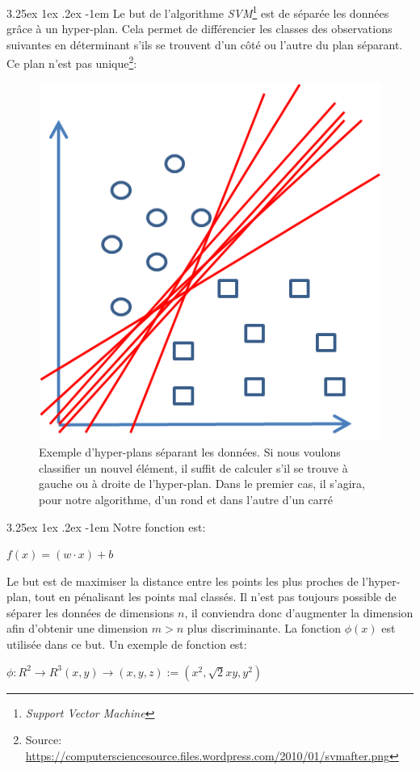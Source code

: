 \documentclass[a4paper, 11pt]{article}
\makeatletter
\renewcommand\paragraph{\@startsection{paragraph}{5}{\z@}%
  {3.25ex \@plus1ex \@minus.2ex}%
  {-1em}%
  {\normalfont\normalsize\bfseries}}
\makeatother
\begin{document}
\paragraph{}
Le but de l'algorithme \textit{SVM}\footnote{\textit{Support Vector Machine}} est de séparée les données grâce à un hyper-plan. Cela permet de différencier les classes des observations suivantes en déterminant s'ils se trouvent d'un côté ou l'autre du plan séparant. Ce plan n'est pas unique\footnote{Source: \url{https://computersciencesource.files.wordpress.com/2010/01/svmafter.png}}: 
\begin{figure}[h!]
\centering
\includegraphics{images/svm_exemple}
\caption{Exemple d'hyper-plans séparant les données. Si nous voulons classifier un nouvel élément, il suffit de calculer s'il se trouve à gauche ou à droite de l'hyper-plan. Dans le premier cas, il s'agira, pour notre algorithme, d'un rond et dans l'autre d'un carré}
\end{figure}

\paragraph{}
Notre fonction est:
\begin{center}
$f(x) = (w \cdot x) + b$
\end{center}
Le but est de maximiser la distance entre les points les plus proches de l'hyper-plan, tout en pénalisant les points mal classés. Il n'est pas toujours possible de séparer les données de dimensions $n$, il conviendra donc d'augmenter la dimension afin d'obtenir une dimension $m > n$ plus discriminante. La fonction $\phi(x)$ est utilisée dans ce but. Un exemple de fonction est:
\begin{center}
$\phi: R^2 \rightarrow R^3 (x, y) \rightarrow (x, y, z):= (x^2, \sqrt{2}x y, y^2)$
\end{center}
\end{document}
